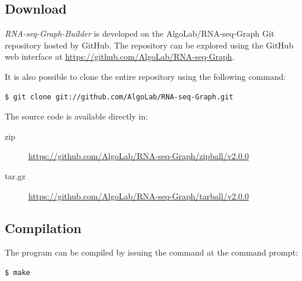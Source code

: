 \documentclass[11pt]{article}
\begin{document}
\subsection*{Download}
\emph{RNA-seq-Graph-Builder} is developed on the AlgoLab/RNA-seq-Graph Git
repository hosted by GitHub. The repository can be explored using the
GitHub web interface at \url{https://github.com/AlgoLab/RNA-seq-Graph}.

It is also possible to clone the entire repository using the following
command:
\begin{verbatim}
$ git clone git://github.com/AlgoLab/RNA-seq-Graph.git
\end{verbatim}

The source code is available directly in:
\begin{description}
\item[zip] \url{https://github.com/AlgoLab/RNA-seq-Graph/zipball/v2.0.0}
\item[tar.gz] \url{https://github.com/AlgoLab/RNA-seq-Graph/tarball/v2.0.0}
\end{description}

\subsection*{Compilation}
The program can be compiled by issuing the command at the command
prompt:
\begin{verbatim}
$ make
\end{verbatim}
\end{document}
